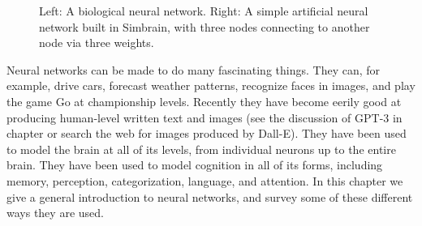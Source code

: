 \begin{figure}[h]
\centering
{}
\hspace*{.2in}
\caption[Left: Mark Miller, Nelson Lab, Brandeis University. Licensed Under: CC BY-ND; Right: Simbrain screenshot.]{Left: A biological neural network. Right: A simple artificial neural network built in Simbrain, with three nodes connecting to another node via three weights.}
\label{introNets}
\end{figure}

Neural networks can be made to do many fascinating things. They can, for example, drive cars, forecast weather patterns, recognize faces in images, and play the game Go at championship levels. Recently they have become eerily good at producing human-level written text and images (see the discussion of GPT-3 in chapter  or search the web for images produced by Dall-E). They have been used to model the brain at all of its levels, from individual neurons up to the entire brain. They have been used to model cognition in all of its forms, including memory, perception, categorization, language, and attention. In this chapter we give a general introduction to neural networks, and survey some of these different ways they are used.

